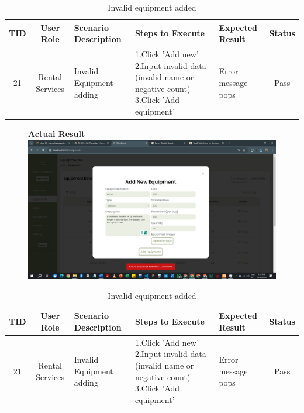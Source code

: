 \begin{table}[ht]
\centering
\begin{tabularx}{\textwidth}{|c|c|X|X|X|c|}
\hline
\textbf{TID} & \textbf{User Role} & \textbf{Scenario Description} & \textbf{Steps to Execute} & \textbf{Expected Result} & \textbf{Status} \\ \hline
21 & Rental Services & Invalid Equipment adding & 1.Click 'Add new' \newline2.Input invalid data (invalid name or negative count) \newline3.Click 'Add equipment' & Error message pops & Pass \\ \hline
\end{tabularx}
\caption{Invalid equipment added}
\end{table}

\begin{figure}[h!]
    \centering
    \textbf{Actual Result}
    \includegraphics[width=1\textwidth]{Images/Test Cases/21. Invalid Equipment adding.png}
\end{figure}
\clearpage


\begin{table}[ht]
\centering
\begin{tabularx}{\textwidth}{|c|c|X|X|X|c|}
\hline
\textbf{TID} & \textbf{User Role} & \textbf{Scenario Description} & \textbf{Steps to Execute} & \textbf{Expected Result} & \textbf{Status} \\ \hline
21 & Rental Services & Invalid Equipment adding & 1.Click 'Add new' \newline2.Input invalid data (invalid name or negative count) \newline3.Click 'Add equipment' & Error message pops & Pass \\ \hline
\end{tabularx}
\caption{Invalid equipment added}
\end{table}

